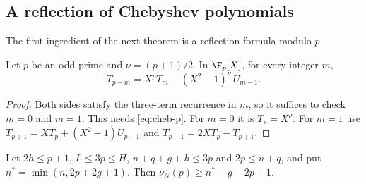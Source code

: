 \subsection{A reflection of Chebyshev polynomials}
The first ingredient of the next theorem is a reflection formula modulo $p$.

\begin{lemma}\label{lem:u3-reflect}
Let $p$ be an odd prime and $\nu=(p+1)/2$. In $\F_p[X]$, for every integer $m$,
\[
 T_{p-m}=X^pT_m-(X^2-1)^{\nu}\,U_{m-1}.
\]
\end{lemma}

\begin{proof}
Both sides satisfy the three-term recurrence in $m$, so it suffices to check $m=0$ and $m=1$. This
needs \eqref{eq:cheb-p}. For $m=0$ it is $T_p=X^p$. For $m=1$ use $T_{p+1}=XT_p+(X^2-1)U_{p-1}$ and
$T_{p-1}=2XT_p-T_{p+1}$.
\end{proof}

\begin{theorem}\label{thm:U}
Let $2h\le p+1$, $L\le3p\le H$, $n+q+g+h\le3p$ and $2p\le n+q$, and put $n^*=\min(n,2p+2g+1)$. Then
$\nu_N(p)\ge n^*-g-2p-1$.
\end{theorem}

